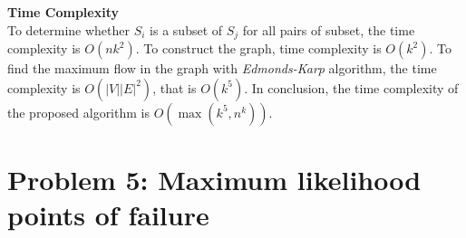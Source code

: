 \documentclass{article}
\newcommand{\Complexity}{\vspace{0.3cm} \noindent\textbf{Time Complexity} \\}
\begin{document}
\Complexity
To determine whether $S_i$ is a subset of $S_j$ for all pairs of subset, the time complexity is 
$O(nk^2)$. To construct the graph, time complexity is $O(k^2)$. To find the maximum flow in the
graph with \textit{Edmonds-Karp} algorithm, the time complexity is $O(|V||E|^2)$, that is $O(k^5)$.
In conclusion, the time complexity of the proposed algorithm is $O(\max(k^5, n^k))$.

\section*{Problem 5: Maximum likelihood points of failure}
\end{document}
